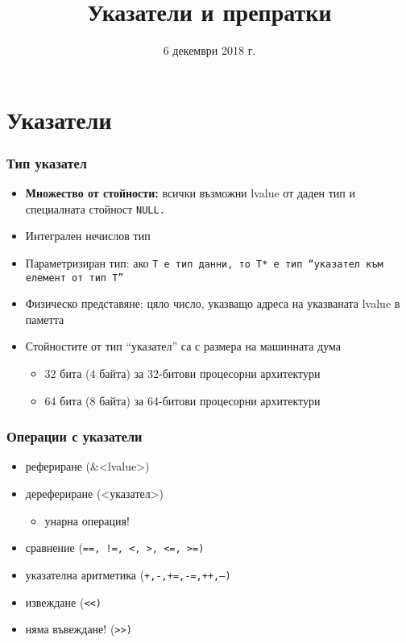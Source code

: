 \documentclass{beamer}
\title{Указатели и препратки}
\date{6 декември 2018 г.}
\begin{document}
\begin{frame}
  \titlepage
\end{frame}

\section{Указатели}

\begin{frame}
  \frametitle{Тип указател}

  \begin{itemize}
  \item \textbf{Множество от стойности:} всички възможни lvalue от даден тип и специалната стойност \tt{NULL}.
  \item Интегрален \alert{нечислов} тип
  \item Параметризиран тип: ако \tt T е тип данни, то \tt{T*} е тип ``указател към елемент от тип \tt T''
  \item Физическо представяне: цяло число, указващо адреса на указваната lvalue в паметта
  \item Стойностите от тип ``указател'' са с размера на машинната дума
    \begin{itemize}
    \item 32 бита (4 байта) за 32-битови процесорни архитектури
    \item 64 бита (8 байта) за 64-битови процесорни архитектури
    \end{itemize}
  \end{itemize}
\end{frame}

\begin{frame}
  \frametitle{Операции с указатели}

  \begin{itemize}
  \item рефериране (\tta\&<lvalue>)
  \item дерефериране (\tta*<указател>)
    \begin{itemize}
    \item \alert{унарна операция!}
    \end{itemize}
  \item сравнение (\tt{==}, \tt{!=}, \tt<, \tt>, \tt{<=}, \tt{>=})
  \item указателна аритметика (\tt+,\tt-,\tt{+=},\tt{-=},\tt{++},\tt{--})
  \item извеждане (\tt{<{}<})
  \item \alert{няма въвеждане! (\tt{>{}>})}
  \end{itemize}
\end{frame}
\end{document}
